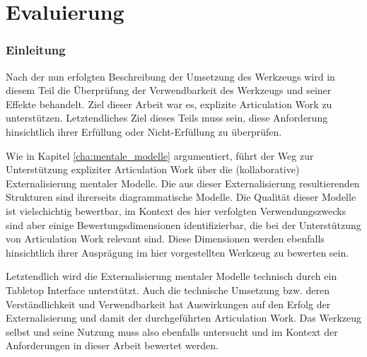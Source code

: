\part{Evaluierung} %
\label{prt:evaluierung}

\section*{Einleitung} %
\label{sec:evaluierung_einleitung}
\thispagestyle{empty}

Nach der nun erfolgten Beschreibung der Umsetzung des Werkzeugs wird in diesem Teil die Überprüfung der Verwendbarkeit des Werkzeugs und seiner Effekte behandelt. Ziel dieser Arbeit war es, explizite Articulation Work zu unterstützen. Letztendliches Ziel dieses Teils muss sein, diese Anforderung hinsichtlich ihrer Erfüllung oder Nicht-Erfüllung zu überprüfen. 

Wie in Kapitel \ref{cha:mentale_modelle} argumentiert, führt der Weg zur Unterstützung expliziter Articulation Work über die (kollaborative) Externalisierung mentaler Modelle. Die aus dieser Externalisierung resultierenden Strukturen sind ihrerseits diagrammatische Modelle. Die Qualität dieser Modelle ist vielschichtig bewertbar, im Kontext des hier verfolgten Verwendungszwecks sind aber einige Bewertungsdimensionen identifizierbar, die bei der Unterstützung von Articulation Work relevant sind. Diese Dimensionen werden ebenfalls hinsichtlich ihrer Ausprägung im hier vorgestellten Werkzeug zu bewerten sein. 

Letztendlich wird die Externalisierung mentaler Modelle technisch durch ein Tabletop Interface unterstützt. Auch die technische Umsetzung bzw. deren Verständlichkeit und Verwendbarkeit hat Auswirkungen auf den Erfolg der Externalisierung und damit der durchgeführten Articulation Work. Das Werkzeug selbst und seine Nutzung muss also ebenfalls untersucht und im Kontext der Anforderungen in dieser Arbeit bewertet werden. 

